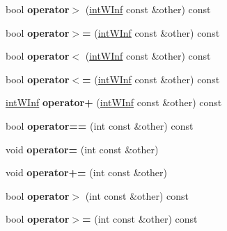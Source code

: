 \begin{DoxyCompactItemize}
\item 
\hypertarget{classintWInf_a0521ab28d747e9bb6cee6fc32719f7d2}{
bool {\bfseries operator$>$} (\hyperlink{classintWInf}{intWInf} const \&other) const }
\label{classintWInf_a0521ab28d747e9bb6cee6fc32719f7d2}

\item 
\hypertarget{classintWInf_a798ebef4fcb58338cadd4683e6ef5231}{
bool {\bfseries operator$>$=} (\hyperlink{classintWInf}{intWInf} const \&other) const }
\label{classintWInf_a798ebef4fcb58338cadd4683e6ef5231}

\item 
\hypertarget{classintWInf_ac6260771561c1ce961e0003860061c8a}{
bool {\bfseries operator$<$} (\hyperlink{classintWInf}{intWInf} const \&other) const }
\label{classintWInf_ac6260771561c1ce961e0003860061c8a}

\item 
\hypertarget{classintWInf_aa95c3a8fcecf15f601e125087d35b9bc}{
bool {\bfseries operator$<$=} (\hyperlink{classintWInf}{intWInf} const \&other) const }
\label{classintWInf_aa95c3a8fcecf15f601e125087d35b9bc}

\item 
\hypertarget{classintWInf_a0db4a612cfc32eca7ca1be55e58d4de2}{
\hyperlink{classintWInf}{intWInf} {\bfseries operator+} (\hyperlink{classintWInf}{intWInf} const \&other) const }
\label{classintWInf_a0db4a612cfc32eca7ca1be55e58d4de2}

\item 
\hypertarget{classintWInf_a9b3a4f2c3753b0fa9ca8401c25018cce}{
bool {\bfseries operator==} (int const \&other) const }
\label{classintWInf_a9b3a4f2c3753b0fa9ca8401c25018cce}

\item 
\hypertarget{classintWInf_a0622a57fcc1c811fc91efafb525b5de8}{
void {\bfseries operator=} (int const \&other)}
\label{classintWInf_a0622a57fcc1c811fc91efafb525b5de8}

\item 
\hypertarget{classintWInf_a08c264f81b8290225bcb20a9f74a192a}{
void {\bfseries operator+=} (int const \&other)}
\label{classintWInf_a08c264f81b8290225bcb20a9f74a192a}

\item 
\hypertarget{classintWInf_ab729c12a0b748f5aa24fea164dc50ac9}{
bool {\bfseries operator$>$} (int const \&other) const }
\label{classintWInf_ab729c12a0b748f5aa24fea164dc50ac9}

\item 
\hypertarget{classintWInf_afb0a91c3c0ba80bcba89aa990a2a800a}{
bool {\bfseries operator$>$=} (int const \&other) const }
\label{classintWInf_afb0a91c3c0ba80bcba89aa990a2a800a}


\end{DoxyCompactItemize}
